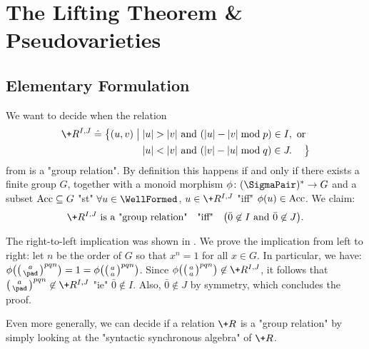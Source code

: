 \section{The Lifting Theorem \& Pseudovarieties}
\label{sec:lifting-theorem}

\subsection{Elementary Formulation}

\begin{example}
	\AP\label{ex:charac-group-relation-monoids}
	We want to decide when the relation
	\begin{align*}
		\+R^{I,J} \defeq \big\{
			(u,v) \;\big\vert\; & |u| > |v| \text{ and } (|u| - |v| \bmod{p}) \in I, \text{ or} \\
			& |u| < |v| \text{ and } (|v| - |u| \bmod{q}) \in J.
		\hphantom{\text{ or}}\big\}	
	\end{align*}
	from  is a \AP"group relation".
	By definition this happens if and only if there exists a finite group $G$,
	together with a monoid morphism $\phi\colon (\SigmaPair)^* \to G$ and a subset
	$\textrm{Acc} \subseteq G$ "st" $\forall u \in \WellFormed$, $u\in \+R^{I,J}$ "iff" $\phi(u) \in \textrm{Acc}$.
	We claim:
	\begin{equation}
		\+R^{I,J} \text{ is a "group relation"}\quad\text{"iff"}\quad
		\big(
			\bar 0 \not\in I \text{ and } \bar 0 \not\in J
		\big).
	\end{equation}

	The right-to-left implication was shown in .
	We prove the implication from left to right:
	let $n$ be the order of $G$ so that $x^n = 1$ for all $x\in G$. In particular, we have:
	$\phi\bigl(\pair{a}{\pad}^{pqn}\bigr) = 1 = \phi\bigl(\pair{a}{a}^{pqn}\bigr)$.
	Since $\phi\bigl(\pair{a}{a}^{pqn}\bigr) \not\in \+R^{I,J}$, it follows that 
	$\pair{a}{\pad}^{pqn} \not\in \+R^{I,J}$
	"ie" $\bar 0 \not\in I$. Also, $\bar 0 \not\in J$ by symmetry, which concludes the proof.
\end{example}

\AP{}
Even more generally, we can decide if a relation $\+R$ is a "group relation"
by simply looking at the "syntactic synchronous algebra" of $\+R$.

\liftingtheoremmonoids

